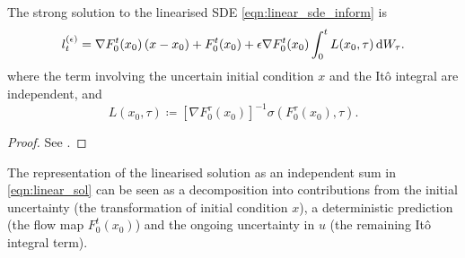 \begin{theorem}\label{thm:limit_sol}
	The strong solution to the linearised SDE \cref{eqn:linear_sde_inform} is
	\begin{equation}
		l_t^{(\epsilon)} = \nabla F_0^t\!\left(x_0\right)\left(x - x_0\right) + F_0^t\!\left(x_0\right) + \epsilon\nabla F_0^t\!\left(x_0\right)\int_0^t{L\!\left(x_0, \tau\right)\dif W_\tau}.
		\label{eqn:linear_sol}
	\end{equation}
	where the term involving the uncertain initial condition \(x\) and the It\^o integral are independent, and
	\begin{equation}
		L\!\left(x_0, \tau\right) \coloneqq \left[\nabla F_0^\tau(x_0)\right]^{-1}\sigma\left(F_0^\tau(x_0), \tau\right).
		\label{eqn:sigma_L_def}
	\end{equation}

\end{theorem}
\begin{proof}
	See .
\end{proof}

The representation of the linearised solution as an independent sum in \cref{eqn:linear_sol} can be seen as a decomposition into contributions from the initial uncertainty (the transformation of initial condition \(x\)), a deterministic prediction (the flow map \(F_0^t\!\left(x_0\right)\)) and the ongoing uncertainty in \(u\) (the remaining It\^o integral term).

